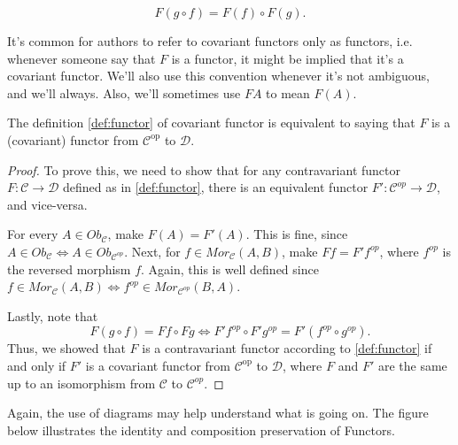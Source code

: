 \begin{definition}[Functor]
\begin{enumerate}[(i)]
\begin{enumerate}
			            \begin{displaymath}
				            F(g \circ f) = F(f) \circ F(g).
			            \end{displaymath}
		      \end{enumerate}
	\end{enumerate}
	It's common for authors to refer to covariant functors only as functors, i.e.
	whenever someone say that $F$ is a functor, it might be implied that it's a covariant functor.
	We'll also use this convention whenever it's not ambiguous, and we'll always.
	Also, we'll sometimes use $FA$ to mean $F(A)$.
	\label{def:functor}
\end{definition}

\begin{lemma}
	The definition \ref{def:functor} of covariant functor is equivalent to
	saying that	$F$ is a (covariant) functor from $\mathcal C^{\text{op}}$ to $\mathcal D$.
	\label{lemma:contravariant}
\end{lemma}
\begin{proof}
	To prove this, we need to show that for any contravariant functor $F:\mathcal C \to \mathcal D$
	defined as in \ref{def:functor}, there is an equivalent functor $F':\mathcal C^{op}\to \mathcal D$,
	and vice-versa.

	For every $A \in Ob_\mathcal C$, make $F(A) = F'(A)$. This is fine, since
	$A \in Ob_\mathcal C \iff A \in Ob_{\mathcal C^{op}}$.
	Next, for $f \in Mor_\mathcal C (A,B)$, make
	$F f = F' f^{op}$, where $f^{op}$ is the reversed morphism $f$. Again, this is well defined since
	$f \in Mor_\mathcal C(A,B) \iff f^{op} \in Mor_{\mathcal C^{op}}(B,A)$.

	Lastly, note that
	\begin{displaymath}
		F(g \circ f) =  F f \circ F g \iff F' f^{op} \circ F' g^{op} = F'(f^{op}\circ g^{op}).
	\end{displaymath}
	Thus, we showed that $F$ is a contravariant functor according to \ref{def:functor}
	if and only if $F'$ is a covariant functor from $\mathcal C^{\text{op}}$ to $\mathcal D$, where
	$F$ and $F'$ are the same up to an isomorphism from $\mathcal C$ to $\mathcal C^{op}$.
\end{proof}

Again, the use of diagrams may help understand what is going on. The figure below
illustrates the identity and composition preservation of Functors.

